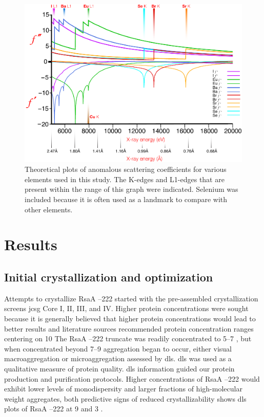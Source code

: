 \begin{figure}[htb]
  	\begin{center}
   		\includegraphics[width=\textwidth]{crystal_chapter/img/edgeplots.pdf}
   	\end{center}
   	\caption[Edge plots for useful anomalous dispersion elements]{
   	Theoretical plots of anomalous scattering coefficients for various elements used in this study. The K-edges and L1-edges that are present within the range of this graph were indicated. Selenium was included because it is often used as a landmark to compare with other elements.}
   	\label{fig:edges}
\end{figure}    

\section{Results}\label{sec:crystal-results}

\subsection{Initial crystallization and optimization}\label{sec:init-cryst-optim} 
 Attempts to crystallize RsaA --222 started with the pre-assembled crystallization screens \ac{jcsg} Core I, II, III, and IV. Higher protein concentrations were sought because it is generally believed that higher protein concentrations would lead to better results and literature sources recommended protein concentration ranges centering on 10 \mgperml{}  The RsaA --222 truncate was readily concentrated to 5--7 \mgperml, but when concentrated beyond 7--9 \mgperml aggregation began to occur, either visual macroaggregation or microaggregation assessed by \ac{dls}. \Ac{dls} was used as a qualitative measure of protein quality. \Ac{dls} information guided our protein production and  purification protocols.  Higher concentrations of RsaA --222 would exhibit lower levels of monodispersity and larger fractions of high-molecular weight aggregates, both predictive signs of reduced crystallizability  shows \ac{dls} plots of RsaA --222 at 9 \mgperml and 3 \mgperml.

